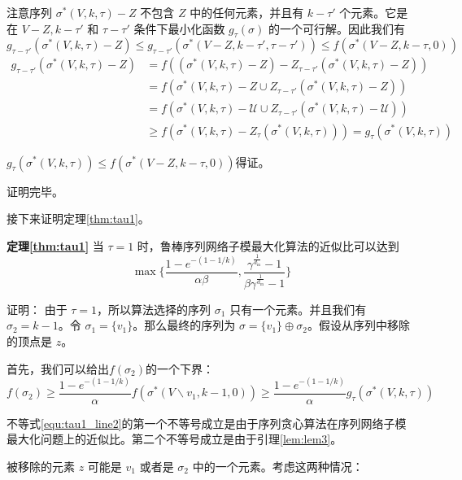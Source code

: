 注意序列 $\sigma^*(V,k,\tau) - Z$ 不包含 $Z$ 中的任何元素，并且有 $k-\tau'$ 个元素。它是在 $V-Z,k-\tau'$ 和 $\tau-\tau'$ 条件下最小化函数 $g_\tau(\sigma)$ 的一个可行解。因此我们有
\begin{equation}
g_{\tau-\tau'}(\sigma^*(V,k,\tau) - Z)  \le g_{\tau-\tau'}(\sigma^*(V-Z,k-\tau',\tau-\tau')) \le f(\sigma^*(V-Z,k-\tau,0))
\end{equation}
\begin{align}
    g_{\tau-\tau'}(\sigma^*(V,k,\tau) - Z) & = f((\sigma^*(V,k,\tau) - Z) - Z_{\tau-\tau'}(\sigma^*(V,k,\tau) - Z)) \\
    & = f(\sigma^*(V,k,\tau) - Z \cup Z_{\tau-\tau'}(\sigma^*(V,k,\tau) - Z)) \\
    & = f(\sigma^*(V,k,\tau) - \mathcal{U} \cup Z_{\tau-\tau'}(\sigma^*(V,k,\tau) - \mathcal{U})) \\
    & \ge f(\sigma^*(V,k,\tau) - Z_{\tau}(\sigma^*(V,k,\tau))) = g_{\tau}(\sigma^*(V,k,\tau))
\end{align}

$g_{\tau}(\sigma^*(V,k,\tau)) \le f(\sigma^*(V-Z,k-\tau,0))$得证。

证明完毕。

接下来证明定理\ref{thm:tau1}。

\noindent \textbf{定理\ref{thm:tau1}} 当 $\tau=1$ 时，鲁棒序列网络子模最大化算法的近似比可以达到
\begin{equation*}
\max\{\frac{1-e^{-(1-1/k)}}{\alpha\beta},\frac{\gamma^{\frac{1}{d_{\text{in}}}}-1}{\beta \gamma^{\frac{1}{d_{\text{in}}}}-1}\}\end{equation*}

证明：
由于 $\tau=1$，所以算法选择的序列 $\sigma_1$ 只有一个元素。并且我们有 $\sigma_2=k-1$。令 $\sigma_1=\{v_1\}$。那么最终的序列为 $\sigma= \{v_1\} \oplus \sigma_2$。假设从序列中移除的顶点是 $z$。

首先，我们可以给出$f(\sigma_2)$的一个下界：
\begin{equation}
    f(\sigma_2)  \ge \frac{1-e^{-(1-1/k)}}{\alpha} f(\sigma^*(V\backslash v_1,k-1,0))
     \ge \frac{1-e^{-(1-1/k)}}{\alpha} g_\tau(\sigma^*(V,k,\tau)) \label{equ:tau1_line2}
\end{equation}

不等式\ref{equ:tau1_line2}的第一个不等号成立是由于序列贪心算法在序列网络子模最大化问题上的近似比\cite{mitrovic2018submodularity}。第二个不等号成立是由于引理\ref{lem:lem3}。

被移除的元素 $z$ 可能是 $v_1$ 或者是 $\sigma_2$ 中的一个元素。考虑这两种情况：

